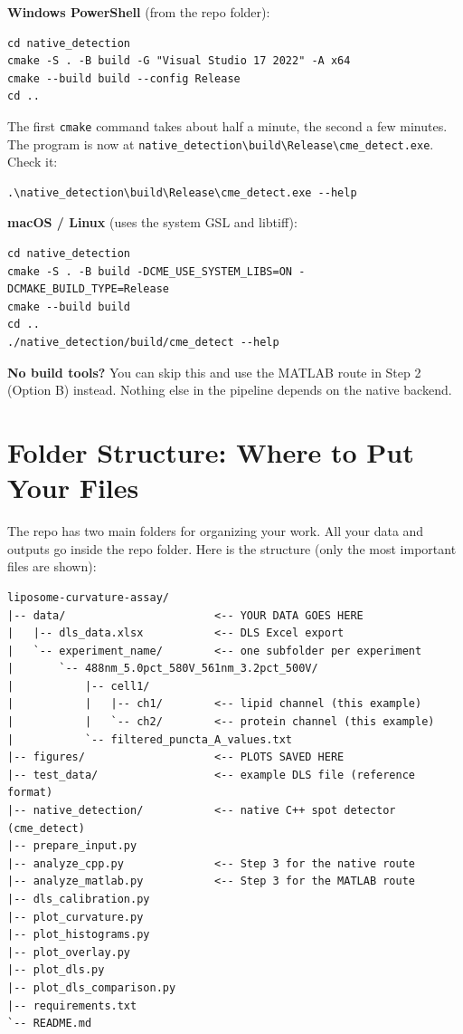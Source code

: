 \documentclass[11pt]{article}
\newcommand{\code}[1]{\texttt{#1}}
\begin{document}
\textbf{Windows PowerShell} (from the repo folder):

\begin{lstlisting}
cd native_detection
cmake -S . -B build -G "Visual Studio 17 2022" -A x64
cmake --build build --config Release
cd ..
\end{lstlisting}

The first \code{cmake} command takes about half a minute, the second a
few minutes. The program is now at
\code{native\_detection\textbackslash build\textbackslash Release\textbackslash cme\_detect.exe}.
Check it:

\begin{lstlisting}
.\native_detection\build\Release\cme_detect.exe --help
\end{lstlisting}

\textbf{macOS / Linux} (uses the system GSL and libtiff):

\begin{lstlisting}
cd native_detection
cmake -S . -B build -DCME_USE_SYSTEM_LIBS=ON -DCMAKE_BUILD_TYPE=Release
cmake --build build
cd ..
./native_detection/build/cme_detect --help
\end{lstlisting}

\begin{notebox}
\textbf{No build tools?} You can skip this and use the MATLAB route in
Step 2 (Option B) instead. Nothing else in the pipeline depends on the
native backend.
\end{notebox}

\section{Folder Structure: Where to Put Your Files}

The repo has two main folders for organizing your work. All your data
and outputs go inside the repo folder. Here is the structure (only
the most important files are shown):

\begin{lstlisting}
liposome-curvature-assay/
|-- data/                       <-- YOUR DATA GOES HERE
|   |-- dls_data.xlsx           <-- DLS Excel export
|   `-- experiment_name/        <-- one subfolder per experiment
|       `-- 488nm_5.0pct_580V_561nm_3.2pct_500V/
|           |-- cell1/
|           |   |-- ch1/        <-- lipid channel (this example)
|           |   `-- ch2/        <-- protein channel (this example)
|           `-- filtered_puncta_A_values.txt
|-- figures/                    <-- PLOTS SAVED HERE
|-- test_data/                  <-- example DLS file (reference format)
|-- native_detection/           <-- native C++ spot detector (cme_detect)
|-- prepare_input.py
|-- analyze_cpp.py              <-- Step 3 for the native route
|-- analyze_matlab.py           <-- Step 3 for the MATLAB route
|-- dls_calibration.py
|-- plot_curvature.py
|-- plot_histograms.py
|-- plot_overlay.py
|-- plot_dls.py
|-- plot_dls_comparison.py
|-- requirements.txt
`-- README.md
\end{lstlisting}
\end{document}
